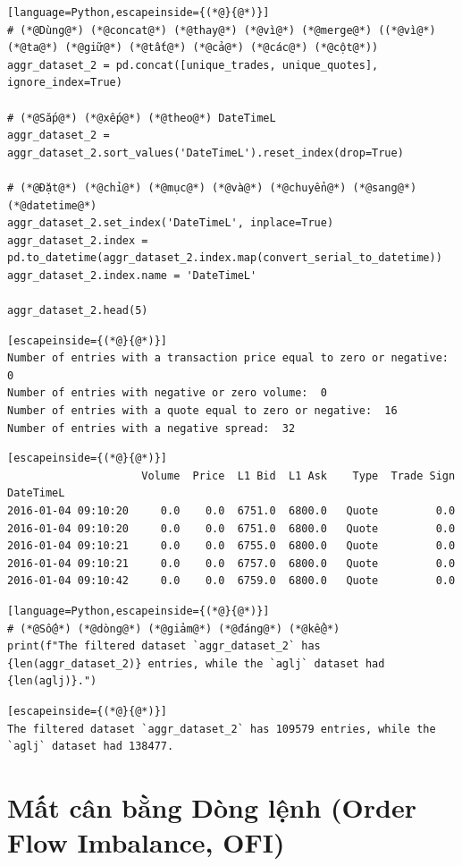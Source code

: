 \begin{lstlisting}[language=Python,escapeinside={(*@}{@*)}]
# (*@Dùng@*) (*@concat@*) (*@thay@*) (*@vì@*) (*@merge@*) ((*@vì@*) (*@ta@*) (*@giữ@*) (*@tất@*) (*@cả@*) (*@các@*) (*@cột@*))
aggr_dataset_2 = pd.concat([unique_trades, unique_quotes], ignore_index=True)

# (*@Sắp@*) (*@xếp@*) (*@theo@*) DateTimeL
aggr_dataset_2 = aggr_dataset_2.sort_values('DateTimeL').reset_index(drop=True)

# (*@Đặt@*) (*@chỉ@*) (*@mục@*) (*@và@*) (*@chuyển@*) (*@sang@*) (*@datetime@*)
aggr_dataset_2.set_index('DateTimeL', inplace=True)
aggr_dataset_2.index = pd.to_datetime(aggr_dataset_2.index.map(convert_serial_to_datetime))
aggr_dataset_2.index.name = 'DateTimeL'

aggr_dataset_2.head(5)
\end{lstlisting}

\begin{lstlisting}[escapeinside={(*@}{@*)}]
Number of entries with a transaction price equal to zero or negative:  0
Number of entries with negative or zero volume:  0
Number of entries with a quote equal to zero or negative:  16
Number of entries with a negative spread:  32
\end{lstlisting}

\begin{lstlisting}[escapeinside={(*@}{@*)}]
                     Volume  Price  L1 Bid  L1 Ask    Type  Trade Sign
DateTimeL                                                             
2016-01-04 09:10:20     0.0    0.0  6751.0  6800.0   Quote         0.0
2016-01-04 09:10:20     0.0    0.0  6751.0  6800.0   Quote         0.0
2016-01-04 09:10:21     0.0    0.0  6755.0  6800.0   Quote         0.0
2016-01-04 09:10:21     0.0    0.0  6757.0  6800.0   Quote         0.0
2016-01-04 09:10:42     0.0    0.0  6759.0  6800.0   Quote         0.0
\end{lstlisting}

\begin{lstlisting}[language=Python,escapeinside={(*@}{@*)}]
# (*@Số@*) (*@dòng@*) (*@giảm@*) (*@đáng@*) (*@kể@*)
print(f"The filtered dataset `aggr_dataset_2` has {len(aggr_dataset_2)} entries, while the `aglj` dataset had {len(aglj)}.")
\end{lstlisting}

\begin{lstlisting}[escapeinside={(*@}{@*)}]
The filtered dataset `aggr_dataset_2` has 109579 entries, while the `aglj` dataset had 138477.
\end{lstlisting}

\section{Mất cân bằng Dòng lệnh (Order Flow Imbalance, OFI)}

